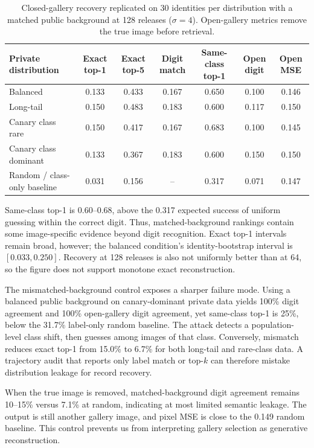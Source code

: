\documentclass[conference]{IEEEtran}
\begin{document}
\begin{table}[t]
\caption{Closed-gallery recovery replicated on 30 identities per distribution with a matched public background at 128 releases ($\sigma=4$). Open-gallery metrics remove the true image before retrieval.}
\label{tab:gallery}
\centering
\begin{tabular}{lcccccc}
\toprule
Private distribution & Exact top-1 & Exact top-5 & Digit match & Same-class top-1 & Open digit & Open MSE \\
\midrule
Balanced & 0.133 & 0.433 & 0.167 & 0.650 & 0.100 & 0.146 \\
Long-tail & 0.150 & 0.483 & 0.183 & 0.600 & 0.117 & 0.150 \\
Canary class rare & 0.150 & 0.417 & 0.167 & 0.683 & 0.100 & 0.145 \\
Canary class dominant & 0.133 & 0.367 & 0.183 & 0.600 & 0.150 & 0.150 \\
\midrule
Random / class-only baseline & 0.031 & 0.156 & -- & 0.317 & 0.071 & 0.147 \\
\bottomrule
\end{tabular}
\end{table}

Same-class top-1 is 0.60--0.68, above the 0.317 expected success of uniform guessing within the correct digit. Thus, matched-background rankings contain some image-specific evidence beyond digit recognition. Exact top-1 intervals remain broad, however; the balanced condition's identity-bootstrap interval is $[0.033,0.250]$. Recovery at 128 releases is also not uniformly better than at 64, so the figure does not support monotone exact reconstruction.

The mismatched-background control exposes a sharper failure mode. Using a balanced public background on canary-dominant private data yields 100\% digit agreement and 100\% open-gallery digit agreement, yet same-class top-1 is 25\%, below the 31.7\% label-only random baseline. The attack detects a population-level class shift, then guesses among images of that class. Conversely, mismatch reduces exact top-1 from 15.0\% to 6.7\% for both long-tail and rare-class data. A trajectory audit that reports only label match or top-$k$ can therefore mistake distribution leakage for record recovery.

When the true image is removed, matched-background digit agreement remains 10--15\% versus 7.1\% at random, indicating at most limited semantic leakage. The output is still another gallery image, and pixel MSE is close to the 0.149 random baseline. This control prevents us from interpreting gallery selection as generative reconstruction.
\end{document}

